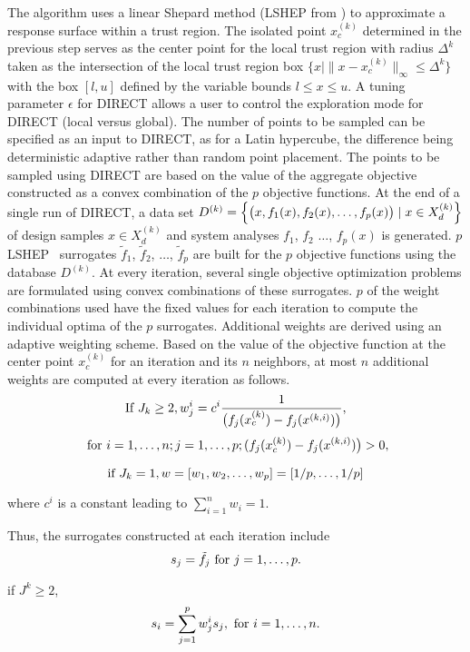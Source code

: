 \noindent The algorithm uses a linear Shepard method (LSHEP from 
\TZWBIB) to approximate a response surface within a trust region. The 
isolated point $x_c^{(k)}$ determined in the previous step serves as the center 
point for the local trust region with radius $\Delta^k$ taken as the 
intersection of the local trust region box $\bigl\{x\mid\|x-x_c^{(k)}\|_\infty 
\le\Delta^k \bigr\}$ with the box $[l,u]$ defined by the variable bounds $l\le 
x \le u$. A tuning parameter $\epsilon$ for DIRECT allows a user to control 
the exploration mode for DIRECT (local versus global). The number of points to 
be sampled can be specified as an input to DIRECT, as for a Latin hypercube, 
the difference being deterministic adaptive rather than random point placement. 
The points to be sampled using DIRECT are based on the value of the 
aggregate objective constructed as a convex combination of the $p$ objective 
functions. At the end of a single run of DIRECT, a data set $D^{(k)}={\Bigl\{
\bigl (x, f_1(x), f_2(x), \ldots, f_p(x)\bigr)\mid x\in X_d^{(k)} \Bigr\}}$ 
of design samples $x\in X_d^{(k)}$ and system analyses $f_1$, $f_2$
$\ldots$, $f_p(x)$ is generated. $p$ LSHEP \TZWBIB\ surrogates $\tilde f_1$,
$\tilde f_2$, $\ldots$, $\tilde f_p$ are built for the $p$ objective functions
using the database $D^{(k)}$. At every iteration, several single objective
optimization problems are formulated using convex combinations of these
surrogates. $p$ of the weight combinations used have the fixed values for 
each iteration to compute the individual optima of the $p$ surrogates.
Additional weights are derived using an adaptive weighting scheme. Based on the
value of the objective function at the center point $x_c^{(k)}$ for an
iteration and its $n$ neighbors, at most $n$ additional weights are computed at 
every iteration as follows. 
$$\hbox{If } J_k \ge 2, {w_j^i={c^i {1 \over {\bigl (f_j(x_c^{(k)})-f_j(x^{(k,i)})\bigr) }} }},$$ 
$$\hbox{  for } i=1,\ldots,n; j=1,\ldots,p; {(f_j(x_c^{(k)})-f_j(x^{(k,i)})\bigr)}>0,$$

$$\hbox{if } J_k = 1, w= [w_1,w_2,\ldots,w_p] = [1/p,\ldots,1/p]$$

\noindent where $c^i$ is a constant leading to ${\sum_{i=1}^n w_i}=1$. 

\par\noindent Thus, the surrogates constructed at each iteration include 
 $$s_j = \tilde f_j \hbox{ for } j=1, \ldots, p.$$

\par\noindent if $J^k \ge 2$,\quad 
$$s_i =\sum_{j=1}^p w_j^{i}s_j, \hbox{ for } i=1, \ldots, n.$$

